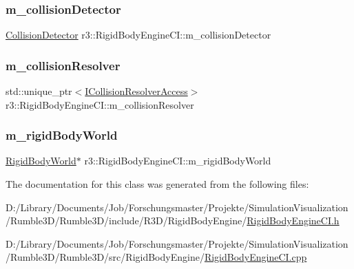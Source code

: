 \subsubsection{\texorpdfstring{m\+\_\+collision\+Detector}{m\_collisionDetector}}
{\footnotesize\ttfamily \mbox{\hyperlink{classr3_1_1_collision_detector}{Collision\+Detector}} r3\+::\+Rigid\+Body\+Engine\+C\+I\+::m\+\_\+collision\+Detector\hspace{0.3cm}{\ttfamily [protected]}}

\mbox{\label{classr3_1_1_rigid_body_engine_c_i_a27f09a82ab77919c2fb78869f6d3c035}} 
\subsubsection{\texorpdfstring{m\+\_\+collision\+Resolver}{m\_collisionResolver}}
{\footnotesize\ttfamily std\+::unique\+\_\+ptr$<$\mbox{\hyperlink{classr3_1_1_i_collision_resolver_access}{I\+Collision\+Resolver\+Access}}$>$ r3\+::\+Rigid\+Body\+Engine\+C\+I\+::m\+\_\+collision\+Resolver\hspace{0.3cm}{\ttfamily [protected]}}

\mbox{\label{classr3_1_1_rigid_body_engine_c_i_afd7ae3fcba8b88ec6c31f2df56aae3f6}} 
\subsubsection{\texorpdfstring{m\+\_\+rigid\+Body\+World}{m\_rigidBodyWorld}}
{\footnotesize\ttfamily \mbox{\hyperlink{classr3_1_1_rigid_body_world}{Rigid\+Body\+World}}$\ast$ r3\+::\+Rigid\+Body\+Engine\+C\+I\+::m\+\_\+rigid\+Body\+World\hspace{0.3cm}{\ttfamily [protected]}}



The documentation for this class was generated from the following files\+:\begin{DoxyCompactItemize}
\item 
D\+:/\+Library/\+Documents/\+Job/\+Forschungsmaster/\+Projekte/\+Simulation\+Visualization/\+Rumble3\+D/\+Rumble3\+D/include/\+R3\+D/\+Rigid\+Body\+Engine/\mbox{\hyperlink{_rigid_body_engine_c_i_8h}{Rigid\+Body\+Engine\+C\+I.\+h}}\item 
D\+:/\+Library/\+Documents/\+Job/\+Forschungsmaster/\+Projekte/\+Simulation\+Visualization/\+Rumble3\+D/\+Rumble3\+D/src/\+Rigid\+Body\+Engine/\mbox{\hyperlink{_rigid_body_engine_c_i_8cpp}{Rigid\+Body\+Engine\+C\+I.\+cpp}}\end{DoxyCompactItemize}
